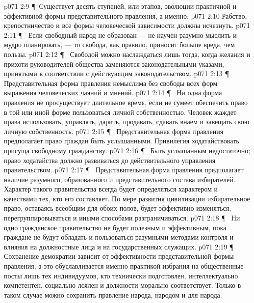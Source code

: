 \vs p071 2:9 \P\ Существует десять ступеней, или этапов, эволюции практичной и эффективной формы представительного правления, а именно:
\vs p071 2:10 \bibnobreakspace {} Рабство, крепостничество и все формы человеческой зависимости должны исчезнуть.
\vs p071 2:11 \P\ \bibnobreakspace {} Если свободный народ не образован --- не научен разумно мыслить и мудро планировать, --- то свобода, как правило, приносит больше вреда, чем пользы.
\vs p071 2:12 \P\ \bibnobreakspace {} Свободой можно наслаждаться лишь тогда, когда желания и прихоти руководителей общества заменяются законодательными указами, принятыми в соответствии с действующим законодательством.
\vs p071 2:13 \P\ \bibnobreakspace {} Представительная форма правления немыслима без свободы всех форм выражения человеческих чаяний и мнений.
\vs p071 2:14 \P\ \bibnobreakspace {} Ни одна форма правления не просуществует длительное время, если не сумеет обеспечить право в той или иной форме пользоваться личной собственностью. Человек жаждет права использовать, управлять, дарить, продавать, сдавать внаем и завещать свою личную собственность.
\vs p071 2:15 \P\ \bibnobreakspace {} Представительная форма правления предполагает право граждан быть услышанными. Привилегия ходатайствовать присуща свободному гражданству.
\vs p071 2:16 \P\ \bibnobreakspace {} Быть услышанным недостаточно; право ходатайства должно развиваться до действительного управления правительством.
\vs p071 2:17 \P\ \bibnobreakspace {} Представительная форма правления предполагает наличие разумного, образованного и представительного состава избирателей. Характер такого правительства всегда будет определяться характером и качествами тех, кто его составляет. По мере развития цивилизации избирательное право, оставаясь всеобщим для обоих полов, будет эффективно изменяться, перегруппировываться и иными способами разграничиваться.
\vs p071 2:18 \P\ \bibnobreakspace {} Ни одно гражданское правительство не будет полезным и эффективным, пока граждане не будут обладать и пользоваться разумными методами контроля и влияния на должностные лица и на государственных служащих.
\vs p071 2:19 \P\ \bibnobreakspace {} Сохранение демократии зависит от эффективности представительной формы правления; а это обуславливается именно практикой избрания на общественные посты лишь тех индивидуумов, кто технически подготовлен, интеллектуально компетентен, социально лоялен и должности морально соответствует. Только в таком случае можно сохранить правление народа, народом и для народа.
